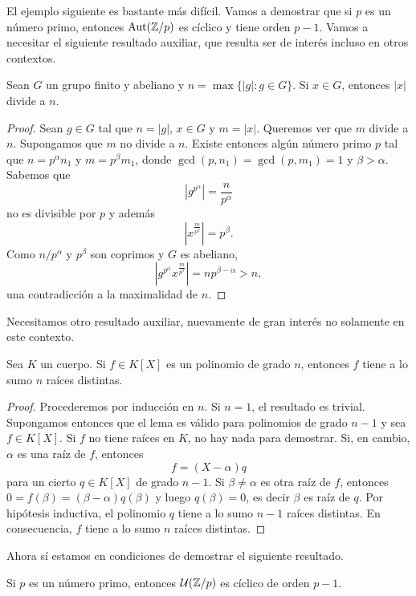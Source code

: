 El ejemplo siguiente es bastante más difícil. Vamos a demostrar que si $p$ es un número primo, entonces
$\operatorname{Aut}(\mathbb{Z}/p)$ es cíclico y tiene orden $p-1$. Vamos a necesitar el siguiente resultado auxiliar, que resulta ser de interés incluso en otros contextos.  

\begin{lemma}
Sean $G$ un grupo finito y abeliano y $n=\max\{|g|:g\in G\}$. Si $x\in G$, entonces $|x|$ divide a $n$. 
\end{lemma}

\begin{proof}
Sean $g\in G$ tal que $n=|g|$, $x\in G$ y $m=|x|$. Queremos ver que $m$ divide a $n$. Supongamos que $m$ no divide a $n$. Existe entonces algún número primo $p$ 
tal que $n=p^\alpha n_1$ y $m=p^\beta m_1$, donde $\gcd(p,n_1)=\gcd(p,m_1)=1$ y $\beta>\alpha$. Sabemos que
\[
|g^	{p^\alpha}|=\frac{n}{p^\alpha}
\]
no es divisible por $p$ y además
\[
|x^{\frac{m}{p^\beta}}|=p^\beta.
\]
Como $n/p^\alpha$ y $p^\beta$ son coprimos y $G$ es abeliano, 
\[
|g^{p^\alpha}x^{\frac{m}{p^\beta}}|=np^{\beta-\alpha}>n,
\]
una contradicción a la maximalidad de $n$. 
\end{proof}

Necesitamos otro resultado auxiliar, nuevamente de gran interés no solamente en este contexto. 

\begin{lemma}
\label{lem:X^n-1}
Sea $K$ un cuerpo. Si $f\in K[X]$ es un polinomio de grado $n$, entonces $f$ tiene a lo sumo $n$ raíces distintas.
\end{lemma}

\begin{proof}
Procederemos por inducción en $n$. Si $n=1$, el resultado es trivial. Supongamos entonces que el lema es válido para polinomios de grado $n-1$ y sea $f\in K[X]$. Si $f$ no tiene raíces en $K$, no hay nada para demostrar. Si, en cambio, $\alpha$ es una raíz de $f$, entonces
\[
f=(X-\alpha)q
\]
para un cierto $q\in K[X]$ de grado $n-1$. Si $\beta\ne\alpha$ es otra raíz de $f$, entonces $0=f(\beta)=(\beta-\alpha)q(\beta)$ y luego $q(\beta)=0$, es decir $\beta$ es raíz de $q$. Por hipótesis inductiva, el polinomio $q$ tiene a lo sumo $n-1$ raíces distintas. En consecuencia, $f$ tiene a lo sumo $n$ raíces distintas.   
\end{proof}

Ahora sí estamos en condiciones de demostrar el siguiente resultado. 

\begin{theorem}
Si $p$ es un número primo, entonces $\mathcal{U}(\mathbb{Z}/p)$ es cíclico de orden $p-1$. 
\end{theorem}

